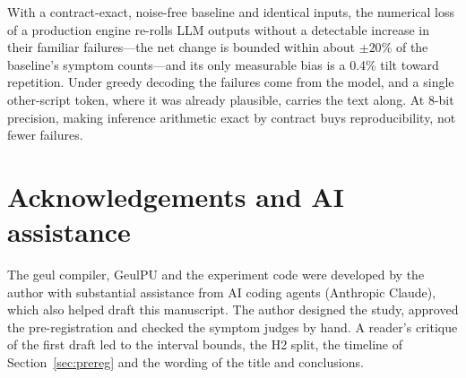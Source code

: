 \documentclass[11pt]{article}
\begin{document}
With a contract-exact, noise-free baseline and identical inputs, the numerical loss of a production engine re-rolls LLM
outputs without a detectable increase in their familiar failures---the net change is bounded within about $\pm20$\% of the
baseline's symptom counts---and its only measurable bias is a 0.4\% tilt toward repetition. Under greedy decoding the
failures come from the model, and a single other-script token, where it was already plausible, carries the text along. At
8-bit precision, making inference arithmetic exact by contract buys reproducibility, not fewer failures.

\section*{Acknowledgements and AI assistance}

The geul compiler, GeulPU and the experiment code were developed by the author with substantial assistance from AI coding
agents (Anthropic Claude), which also helped draft this manuscript. The author designed the study, approved the
pre-registration and checked the symptom judges by hand. A reader's critique of the first draft led to the interval bounds,
the H2 split, the timeline of Section~\ref{sec:prereg} and the wording of the title and conclusions.
\end{document}
